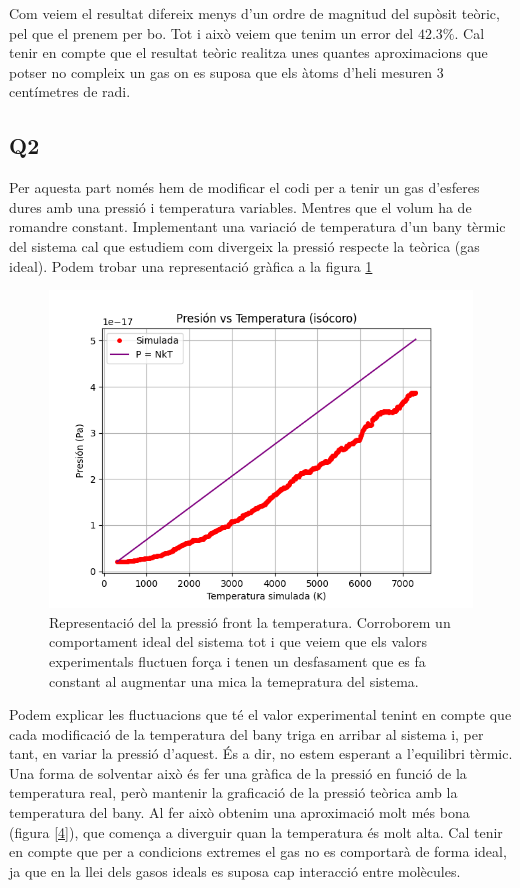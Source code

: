\documentclass{article}
\begin{document}
	Com veiem el resultat difereix menys d'un ordre de magnitud del supòsit teòric, pel que el prenem per bo. Tot i això veiem que tenim un error del $42.3\%$. Cal tenir en compte que el resultat teòric realitza unes quantes aproximacions que potser no compleix un gas on es suposa que els àtoms d'heli mesuren $3$ centímetres de radi. 
	
	
	\subsection*{Q2}
	
	Per aquesta part només hem de modificar el codi per a tenir un gas d'esferes dures amb una pressió i temperatura variables. Mentres que el volum ha de romandre constant. Implementant una variació de temperatura d'un bany tèrmic del sistema cal que estudiem com divergeix la pressió respecte la teòrica (gas ideal). Podem trobar una representació gràfica a la figura \ref{labe}
	
	\begin{figure}[h!]
	\centering
	\includegraphics[width=0.7\linewidth]{Q2.png}
	\caption{Representació del la pressió front la temperatura. Corroborem un comportament ideal del sistema tot i que veiem que els valors experimentals fluctuen força i tenen un desfasament que es fa constant al augmentar una mica la temepratura del sistema.}
	\label{labe}
	\end{figure}
	Podem explicar les fluctuacions que té el valor experimental tenint en compte que cada modificació de la temperatura del bany triga en arribar al sistema i, per tant, en variar la pressió d'aquest. És a dir, no estem esperant a l'equilibri tèrmic. Una forma de solventar això és fer una gràfica de la pressió en funció de la temperatura real, però mantenir la graficació de la pressió teòrica amb la temperatura del bany. Al fer això obtenim una aproximació molt més bona (figura \ref{4}), que comença a diverguir quan la temperatura és molt alta. Cal tenir en compte que per a condicions extremes el gas no es comportarà de forma ideal, ja que en la llei dels gasos ideals es suposa cap interacció entre molècules.
	
\end{document}
